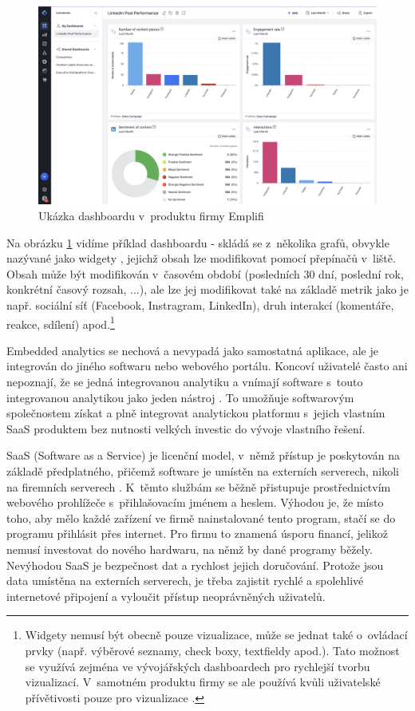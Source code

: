 \documentclass[czech, bc, kiv, he, iso690numb]{fasthesis}
\begin{document}
\begin{figure}
	\centering
	\includegraphics[width=1\textwidth]{pictures/emplifi-dashboard-example.png}
	\caption{Ukázka dashboardu v~produktu firmy Emplifi \cite{emplifidashboardIMAGE}}
	\label{fig:emplifiDashUkazka}
\end{figure}

Na obrázku \ref{fig:emplifiDashUkazka} vidíme příklad dashboardu - skládá se z~několika grafů, obvykle nazývané jako widgety \cite{emplifiDashboard}, jejichž obsah lze modifikovat pomocí přepínačů v~liště. Obsah může být modifikován v~časovém období (posledních 30 dní, poslední rok, konkrétní časový rozsah, ...), ale lze jej modifikovat také na základě metrik jako je např. sociální síť (Facebook, Instragram, LinkedIn), druh interakcí (komentáře, reakce, sdílení) apod.\footnote{Widgety nemusí být obecně pouze vizualizace, může se jednat také o~ovládací prvky (např. výběrové seznamy, check boxy, textfieldy apod.). Tato možnost se využívá zejména ve vývojářských dashboardech pro rychlejší tvorbu vizualizací. V~samotném produktu firmy se ale používá kvůli uživatelské přívětivosti pouze pro vizualizace \cite{emplifiDashboard}. 
}

Embedded analytics se nechová a nevypadá jako samostatná aplikace, ale je integrován do jiného softwaru nebo webového portálu. Koncoví uživatelé často ani nepoznají, že se jedná
integrovanou analytiku a vnímají software s~touto integrovanou analytikou jako jeden nástroj \cite{goodDataEmbedded}. To umožňuje softwarovým společnostem získat a plně
integrovat analytickou platformu s~jejich vlastním SaaS produktem bez nutnosti velkých investic do vývoje vlastního řešení. 

SaaS (Software as a Service) je licenční model, v~němž přístup je poskytován na základě předplatného, přičemž software je umístěn na externích serverech, nikoli na firemních serverech \cite{saasDefinition}.
K~těmto službám se běžně přistupuje prostřednictvím webového prohlížeče s~přihlašovacím jménem a heslem. Výhodou je, že místo toho, aby mělo každé zařízení ve firmě nainstalované
tento program, stačí se do programu přihlásit přes internet. Pro firmu to znamená úsporu financí, jelikož nemusí investovat do nového hardwaru, na němž by dané programy běžely. 
Nevýhodou SaaS je bezpečnost dat a rychlost jejich doručování. Protože jsou data umístěna na externích serverech, je třeba zajistit rychlé a spolehlivé internetové připojení a vyloučit
přístup neoprávněných uživatelů.
\end{document}
